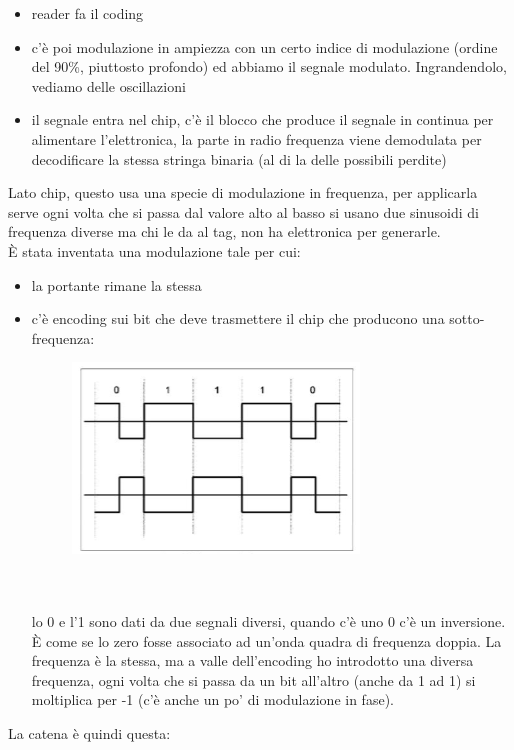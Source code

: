 \documentclass[oneside, 12pt]{extbook}
\begin{document}
\begin{itemize}
	\item reader fa il coding
	\item c'è poi modulazione in ampiezza con un certo indice di modulazione (ordine del 90\%, piuttosto profondo) ed abbiamo il segnale modulato. Ingrandendolo, vediamo delle oscillazioni
	\item il segnale entra nel chip, c'è il blocco che produce il segnale in continua per alimentare l'elettronica, la parte in radio frequenza viene demodulata per decodificare la stessa stringa binaria (al di la delle possibili perdite)
\end{itemize}
Lato chip, questo usa una specie di modulazione in frequenza, per applicarla serve ogni volta che si passa dal valore alto al basso si usano due sinusoidi di frequenza diverse ma chi le da al tag, non ha elettronica per generarle.\\È stata inventata una modulazione tale per cui:
\begin{itemize}
	\item la portante rimane la stessa
	\item c'è encoding sui bit che deve trasmettere il chip che producono una sotto-frequenza:\\ 
	\begin{figure}[!h]
		\includegraphics[scale=0.3]{immagini/data-encoding.png}
	\end{figure}
	\\\\lo 0 e l'1 sono dati da due segnali diversi, quando c'è uno 0 c'è un inversione. È come se lo zero fosse associato ad un'onda quadra di frequenza doppia. La frequenza è la stessa, ma a valle dell'encoding ho introdotto una diversa frequenza, ogni volta che si passa da un bit all'altro (anche da 1 ad 1) si moltiplica per -1 (c'è anche un po' di modulazione in fase).
\end{itemize}
La catena è quindi questa:\\
\end{document}
